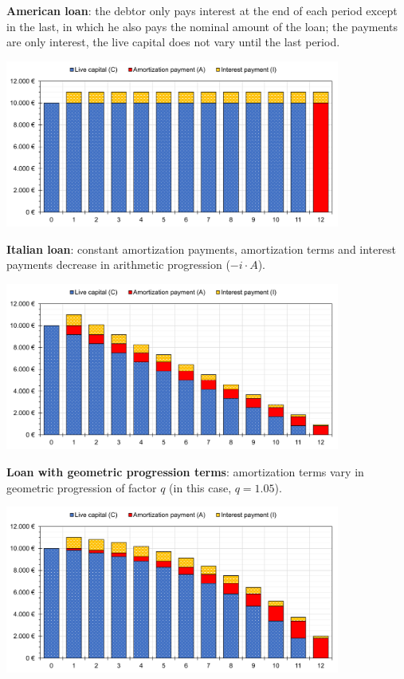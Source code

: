 \documentclass[10pt, a4paper]{article}
\begin{document}
	\textbf{American loan}: the debtor only pays interest at the end of each period except in the last, in which he also pays the nominal amount of the loan; the payments are only interest, the live capital does not vary until the last period.
	
	\begin{center}
		\includegraphics[width=11cm]{figures/american-en.pdf}
	\end{center}
	
	\textbf{Italian loan}: constant amortization payments, amortization terms and interest payments decrease in arithmetic progression ($-i \cdot A$).	
	
	\begin{center}
		\includegraphics[width=11cm]{figures/italian-en.pdf}
	\end{center}
	
	\textbf{Loan with geometric progression terms}: amortization terms vary in geometric progression of factor $q$ (in this case, $q = 1.05$).
	
	\begin{center}
		\includegraphics[width=11cm]{figures/geometric-en.pdf}
	\end{center}
	
\end{document}

